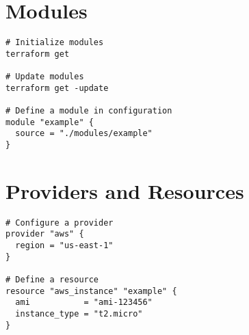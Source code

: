 \documentclass[11pt]{article}
\begin{document}
    \section*{Modules}
    \begin{lstlisting}[style=terraformStyle]
# Initialize modules
terraform get

# Update modules
terraform get -update

# Define a module in configuration
module "example" {
  source = "./modules/example"
}
    \end{lstlisting}

    \section*{Providers and Resources}
    \begin{lstlisting}[style=terraformStyle]
# Configure a provider
provider "aws" {
  region = "us-east-1"
}

# Define a resource
resource "aws_instance" "example" {
  ami           = "ami-123456"
  instance_type = "t2.micro"
}
    \end{lstlisting}
\end{document}
